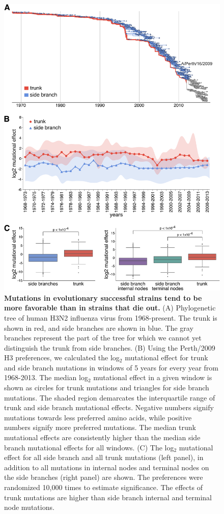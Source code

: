 \documentclass[9pt,twocolumn,twoside]{pnas-new}
\begin{document}
\begin{figure}
\centering
\includegraphics[width=12cm]{figs/trunkvssidebranch/trunkvssidebranch.pdf}
\caption{\label{fig:trunkvssidebranch}
{\bf Mutations in evolutionary successful strains tend to be more favorable than in strains that die out.}
(A) Phylogenetic tree of human H3N2 influenza virus from 1968-present. 
The trunk is shown in red, and side branches are shown in blue.
The gray branches represent the part of the tree for which we cannot yet distinguish the trunk from side branches.
(B) Using the Perth/2009 H3 preferences, we calculated the log$_{2}$ mutational effect for trunk and side branch mutations in windows of 5 years for every year from 1968-2013. 
The median log$_{2}$ mutational effect in a given window is shown as circles for trunk mutations and triangles for side branch mutations. 
The shaded region demarcates the interquartile range of trunk and side branch mutational effects.
Negative numbers signify mutations towards less preferred amino acids, while positive numbers signify more preferred mutations.
The median trunk mutational effects are consistently higher than the median side branch mutational effects for all windows.
(C) The log$_{2}$ mutational effect for all side branch and all trunk mutations (left panel), in addition to all mutations in internal nodes and terminal nodes on the side branches (right panel) are shown.
The preferences were randomized 10,000 times to estimate significance.
The effects of trunk mutations are higher than side branch internal and terminal node mutations.
}
\end{figure}
\end{document}
